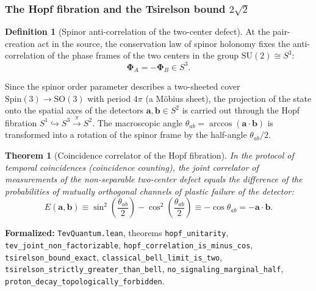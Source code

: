 \documentclass[11pt,a4paper]{article}
\newtheorem{theorem}{Theorem}
\theoremstyle{definition}
\newtheorem{definition}{Definition}
\theoremstyle{remark}
\begin{document}
\subsubsection{The Hopf fibration and the Tsirelson bound $2\sqrt{2}$}

\begin{definition}[Spinor anti-correlation of the two-center defect]
At the pair-creation act in the source, the conservation law of spinor holonomy fixes the anti-correlation of the phase frames of the two centers in the group $\mathrm{SU}(2) \cong S^3$:
\begin{equation}
\boldsymbol{\Phi}_A = -\boldsymbol{\Phi}_B \in S^3.
\label{eq:spinor_anti_correlation}
\end{equation}
\end{definition}

Since the spinor order parameter describes a two-sheeted cover $\mathrm{Spin}(3) \to \mathrm{SO}(3)$ with period $4\pi$ (a Möbius sheet), the projection of the state onto the spatial axes of the detectors $\mathbf{a}, \mathbf{b} \in S^2$ is carried out through the Hopf fibration $S^1 \hookrightarrow S^3 \xrightarrow{\pi} S^2$. The macroscopic angle $\theta_{ab} = \arccos(\mathbf{a} \cdot \mathbf{b})$ is transformed into a rotation of the spinor frame by the half-angle $\theta_{ab}/2$.

\begin{theorem}[Coincidence correlator of the Hopf fibration]
\label{thm:hopf_correlation_exact_proof}
In the protocol of temporal coincidences (coincidence counting), the joint correlator of measurements of the non-separable two-center defect equals the difference of the probabilities of mutually orthogonal channels of plastic failure of the detector:
\begin{equation}
E(\mathbf{a}, \mathbf{b}) \equiv \sin^2\left(\frac{\theta_{ab}}{2}\right) - \cos^2\left(\frac{\theta_{ab}}{2}\right) \equiv -\cos\theta_{ab} = -\mathbf{a} \cdot \mathbf{b}.
\label{eq:hopf_correlation_minus_cos}
\end{equation}
\end{theorem}

\noindent\small\textbf{Formalized:} \texttt{TevQuantum.lean}, theorems \texttt{hopf_unitarity}, \texttt{tev_joint_non_factorizable}, \texttt{hopf_correlation_is_minus_cos}, \texttt{tsirelson_bound_exact}, \texttt{classical_bell_limit_is_two}, \texttt{tsirelson_strictly_greater_than_bell}, \texttt{no_signaling_marginal_half}, \texttt{proton_decay_topologically_forbidden}.
\end{document}

